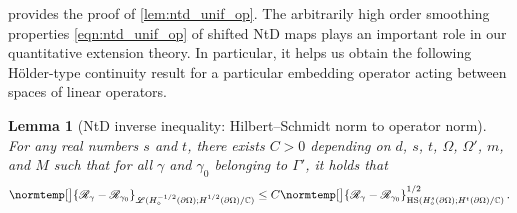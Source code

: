 \documentclass[pdflatex,sn-mathphys-num]{sn-jnl-preprint}
\newcommand{\C}{\mathbb{C}}
\newcommand{\sL}{\mathscr{L}}
\newcommand{\sR}{\mathscr{R}}
\newcommand{\pOmega}{{\partial\Omega}}
\newcommand{\ntd}{\mathscr{R}_{\gamma}}
\newcommand{\norm}{\normtemp}
\newcommand{\HS}{\mathrm{HS}} %
\theoremstyle{thmstyleone}%
\newtheorem{lemma}[theorem]{Lemma}%
\theoremstyle{thmstyletwo}%
\theoremstyle{thmstylethree}%
\numberwithin{equation}{section}
\numberwithin{theorem}{section}
\begin{document}
 provides the proof of \cref{lem:ntd_unif_op}. The arbitrarily high order smoothing properties \eqref{eqn:ntd_unif_op} of shifted NtD maps plays an important role in our quantitative extension theory. In particular, it helps us obtain the following H\"older-type continuity result for a particular embedding operator acting between spaces of linear operators.
\begin{lemma}[NtD inverse inequality: Hilbert--Schmidt norm to operator norm]\label{lem:hs_to_op}
    For any real numbers $s$ and $t$, there exists $C>0$ depending on $d$, $s$, $t$, $\Omega$, $\Omega'$, $m$, and $M$ such that for all $\gamma$ and $\gamma_0$ belonging to $\Gamma'$, it holds that
    \begin{align}\label{eqn:hs_to_op}
        \norm[\big]{\ntd-\sR_{\gamma_0}}_{\sL(H^{-1/2}_\diamond(\pOmega);H_{\phantom{\diamond}}^{1/2}(\pOmega)/\C)}\leq C\norm[\big]{\ntd-\sR_{\gamma_0}}^{1/2}_{\HS(H^{s}_\diamond(\pOmega);H^{t}(\pOmega)/\C)}\,.
    \end{align}
\end{lemma}
\end{document}
